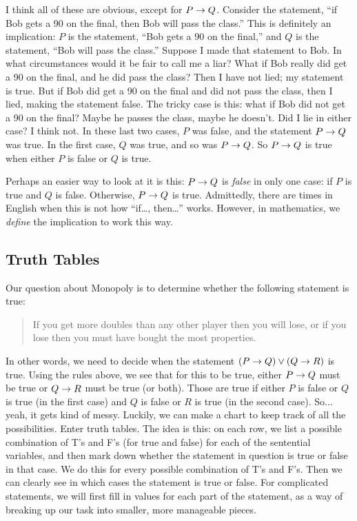 \documentclass[12pt]{article}
\begin{document}
I think all of these are obvious, except for $P \rightarrow Q$.  Consider the statement, ``if Bob gets a 90 on the final, then Bob will pass the class.''  This is definitely an implication: $P$ is the statement, ``Bob gets a 90 on the final,'' and $Q$ is the statement, ``Bob will pass the class.'' Suppose I made that statement to Bob.  In what circumstances would it be fair to call me a liar?  What if Bob really did get a 90 on the final, and he did pass the class?  Then I have not lied; my statement is true.  But if Bob did get a 90 on the final and did not pass the class, then I lied, making the statement false.  The tricky case is this: what if Bob did not get a 90 on the final?  Maybe he passes the class, maybe he doesn't.  Did I lie in either case?  I think not.  In these last two cases, $P$ was false, and the statement $P \rightarrow Q$ was true.  In the first case, $Q$ was true, and so was $P \rightarrow Q$.  So $P \rightarrow Q$ is true when either $P$ is false or $Q$ is true.  

Perhaps an easier way to look at it is this: $P \rightarrow Q$ 
is {\em false} in only one case: if $P$ is true and $Q$ is false.  Otherwise, $P \rightarrow Q$ is true.  Admittedly, there are times in English when this is not how ``if\ldots, then\ldots'' works.  However, in mathematics, we {\em define} the implication to work this way.


\subsection{Truth Tables}

Our question about Monopoly is to determine whether the following statement is true:
\begin{quote}
If you get more doubles than any other player then you will lose, or if you lose then you must have bought the most properties.
\end{quote}
In other words, we need to decide when the statement $(P \rightarrow Q) \vee (Q \rightarrow R)$ is true.  Using the rules above, we see that for this to be true, either $P \rightarrow Q$ must be true or $Q \rightarrow R$ must be true (or both).  Those are true if either $P$ is false or $Q$ is true (in the first case) and $Q$ is false or $R$ is true (in the second case).  So... yeah, it gets kind of messy.  Luckily, we can make a chart to keep track of all the possibilities.  Enter truth tables.  The idea is this: on each row, we list a possible combination of T's and F's (for true and false) for each of the sentential variables, and then mark down whether the statement in question is true or false in that case.  We do this for every possible combination of T's and F's.  Then we can clearly see in which cases the statement is true or false.  For complicated statements, we will first fill in values for each part of the statement, as a way of breaking up our task into smaller, more manageable pieces.
\end{document}
